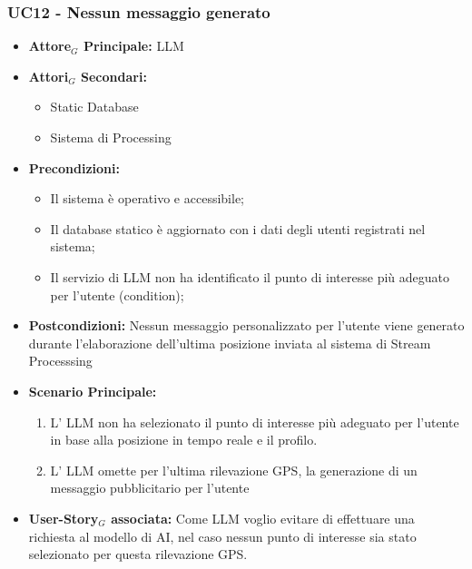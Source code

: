 \documentclass[11pt]{article}
\begin{document}
\begin{justify}

\subsubsection{\textbf{UC12 - Nessun messaggio generato}}

\label{UC12}
\begin{itemize}
    \item \textbf{Attore$_G$ Principale:} LLM
    \item \textbf{Attori$_G$ Secondari:} 
    \begin{itemize}
        \item Static Database
        \item Sistema di Processing
    \end{itemize}
    \item \textbf{Precondizioni:} 
        \begin{itemize}
          \item Il sistema è operativo e accessibile;
          \item Il database statico è aggiornato con i dati degli utenti registrati nel sistema;
          \item Il servizio di LLM non ha identificato il punto di interesse più adeguato per l'utente (condition);
        \end{itemize}
      \item \textbf{Postcondizioni:} Nessun messaggio personalizzato per l'utente viene generato durante l'elaborazione dell'ultima posizione inviata al sistema di Stream Processsing\\
    \item \textbf{Scenario Principale:} 
        \begin{enumerate}
        \item L' LLM non ha selezionato il punto di interesse più adeguato per l'utente in base alla posizione in tempo reale e il profilo.
        \item L' LLM omette per l'ultima rilevazione GPS, la generazione di un messaggio pubblicitario per l'utente
        \end{enumerate}
    \item \textbf{User-Story$_G$ associata:} Come LLM voglio evitare di effettuare una richiesta al modello di AI, nel caso nessun punto di interesse sia stato selezionato per questa rilevazione GPS.
\end{itemize}


\end{justify}
\end{document}
